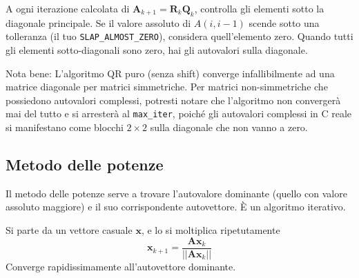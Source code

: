 \documentclass[10pt]{article}
\begin{document}
A ogni iterazione calcolata di $\mathbf{A}_{k+1}=\mathbf{R}_k \mathbf{Q}_k$, controlla gli elementi sotto la diagonale principale. Se il valore assoluto di $A(i,i-1)$ scende sotto una tolleranza (il tuo \texttt{SLAP\_ALMOST\_ZERO}), considera quell'elemento zero. Quando tutti gli elementi sotto-diagonali sono zero, hai gli autovalori sulla diagonale.

Nota bene: L'algoritmo QR puro (senza shift) converge infallibilmente ad una matrice diagonale per matrici simmetriche. Per matrici non-simmetriche che possiedono autovalori complessi, potresti notare che l'algoritmo non convergerà mai del tutto e si arresterà al \texttt{max\_iter}, poiché gli autovalori complessi in C reale si manifestano come blocchi $2 \times 2$ sulla diagonale che non vanno a zero.



\subsection{Metodo delle potenze}

Il metodo delle potenze serve a trovare l'autovalore dominante (quello con valore assoluto maggiore) e il suo corrispondente autovettore. È un algoritmo iterativo.

Si parte da un vettore casuale $\mathbf{x}$, e lo si moltiplica ripetutamente
$$ \mathbf{x}_{k+1} = \frac{\mathbf{A} \mathbf{x}_k}{||\mathbf{A} \mathbf{x}_k||} $$
Converge rapidissimamente all'autovettore dominante.
\end{document}
